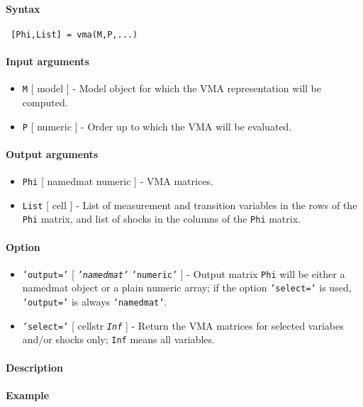 


	\paragraph{Syntax}
 
 \begin{verbatim}
 [Phi,List] = vma(M,P,...)
 \end{verbatim}
 
 \paragraph{Input arguments}
 
 \begin{itemize}
 \item
   \texttt{M} {[} model {]} - Model object for which the VMA
   representation will be computed.
 \item
   \texttt{P} {[} numeric {]} - Order up to which the VMA will be
   evaluated.
 \end{itemize}
 
 \paragraph{Output arguments}
 
 \begin{itemize}
 \item
   \texttt{Phi} {[} namedmat \textbar{} numeric {]} - VMA matrices.
 \item
   \texttt{List} {[} cell {]} - List of measurement and transition
   variables in the rows of the \texttt{Phi} matrix, and list of shocks
   in the columns of the \texttt{Phi} matrix.
 \end{itemize}
 
 \paragraph{Option}
 
 \begin{itemize}
 \item
   \texttt{'output='} {[} \emph{\texttt{'namedmat'}} \textbar{}
   \texttt{'numeric'} {]} - Output matrix \texttt{Phi} will be either a
   namedmat object or a plain numeric array; if the option
   \texttt{'select='} is used, \texttt{'output='} is always
   \texttt{'namedmat'}.
 \item
   \texttt{'select='} {[} cellstr \textbar{} \emph{\texttt{Inf}} {]} -
   Return the VMA matrices for selected variabes and/or shocks only;
   \texttt{Inf} means all variables.
 \end{itemize}
 
 \paragraph{Description}
 
 \paragraph{Example}


